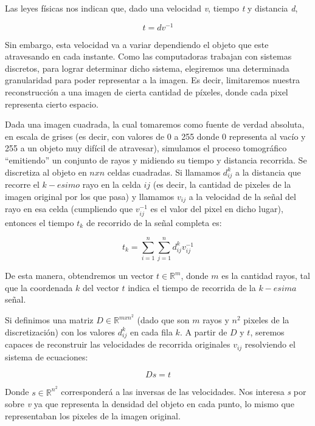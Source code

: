 Las leyes físicas nos indican que, dado una velocidad \textit{v}, tiempo \textit{t} y distancia \textit{d},

\begin{equation*}
    t = d v^{-1}
\end{equation*}

Sin embargo, esta velocidad va a variar dependiendo el objeto que este atravesando en cada instante.
Como las computadoras trabajan con sistemas discretos,
para lograr determinar dicho sistema, elegiremos
una determinada granularidad para poder representar a la imagen.
Es decir, limitaremos nuestra reconstrucción a una imagen de cierta
cantidad de píxeles, donde cada pixel representa cierto espacio.

Dada una imagen cuadrada, la cual tomaremos como fuente de verdad absoluta,
en escala de grises (es decir, con valores de 0 a 255 donde 0 representa al vacío y 255 a un objeto muy difícil de atravesar),
simulamos el proceso tomográfico ``emitiendo'' un conjunto de rayos
y midiendo su tiempo y distancia recorrida.
Se discretiza al objeto en $n x n$ celdas cuadradas.
Si llamamos $d^{k}_{ij}$ a la distancia que recorre el $k-esimo$ rayo en la celda $ij$
(es decir, la cantidad de pixeles de la imagen original por los que pasa)
y llamamos $v_{ij}$ a la velocidad de la señal del rayo en esa celda
(cumpliendo que $v^{-1}_{ij}$ es el valor del pixel en dicho lugar),
entonces el tiempo $t_{k}$ de recorrido de la señal completa es:

\begin{equation*}
    t_{k} = \sum_{i=1}^{n} \sum_{j=1}^{n} d^{k}_{ij} v^{-1}_{ij}
\end{equation*}

De esta manera, obtendremos un vector $t \in \mathbb{R}^{m}$, donde $m$ es la cantidad rayos, 
tal que la coordenada $k$ del vector $t$ indica el tiempo de recorrida de la $k-esima$ señal.

Si definimos una matriz $D \in \mathbb{R}^{mxn^{2}}$
(dado que son $m$ rayos y $n^2$ pixeles de la discretización)
con los valores $d^{k}_{ij}$ en cada fila $k$.
A partir de $D$ y $t$,
seremos capaces de reconstruir las velocidades de recorrida originales $v_{ij}$ resolviendo el sistema de ecuaciones: 

\begin{equation*}
    Ds = t    
\end{equation*}

Donde $s \in \mathbb{R}^{n^{2}}$ corresponderá a las inversas de las velocidades.
Nos interesa \textit{s} por sobre \textit{v} ya que representa la densidad del objeto en cada punto,
lo mismo que representaban los pixeles de la imagen original.

